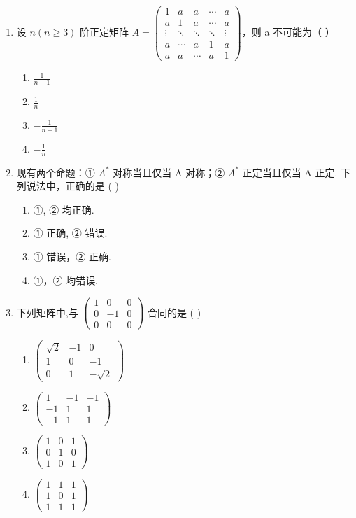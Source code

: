 \documentclass[12pt, a4paper]{ctexart}
\begin{document}
\begin{enumerate}
    \item 设 $ n(n \geq 3) $ 阶正定矩阵 $ A = \begin{pmatrix} 1 & a & a & \cdots & a \\ a & 1 & a & \cdots & a \\ \vdots & \ddots & \ddots & \ddots & \vdots \\ a & \cdots & a & 1 & a \\ a & a & \cdots & a & 1 \end{pmatrix} $，则 a 不可能为（ \underline{\hspace{1cm}} ）
    \begin{enumerate}[label=(\Alph*)]
        \item $ \frac{1}{n-1} $
        \item $ \frac{1}{n} $
        \item $ -\frac{1}{n-1} $
        \item $ -\frac{1}{n} $
    \end{enumerate}

    \item 现有两个命题：① $ A^{*} $ 对称当且仅当 A 对称；② $ A^{*} $ 正定当且仅当 A 正定. 下列说法中，正确的是 ( \underline{\hspace{1cm}} )
    \begin{enumerate}[label=(\Alph*)]
        \item ①, ② 均正确.
        \item ① 正确, ② 错误.
        \item ① 错误，② 正确.
        \item ①，② 均错误.
    \end{enumerate}

    \item 下列矩阵中,与 $ \begin{pmatrix}1&0&0\\0&-1&0\\0&0&0\end{pmatrix} $ 合同的是 ( \underline{\hspace{1cm}} )
    \begin{enumerate}[label=(\Alph*)]
        \item $ \begin{pmatrix}\sqrt{2}&-1&0\\1&0&-1\\0&1&-\sqrt{2}\end{pmatrix} $
        \item $ \begin{pmatrix}1&-1&-1\\-1&1&1\\-1&1&1\end{pmatrix} $
        \item $ \begin{pmatrix}1&0&1\\0&1&0\\1&0&1\end{pmatrix} $
        \item $ \begin{pmatrix}1&1&1\\1&0&1\\1&1&1\end{pmatrix} $
    \end{enumerate}


\end{enumerate}
\end{document}
